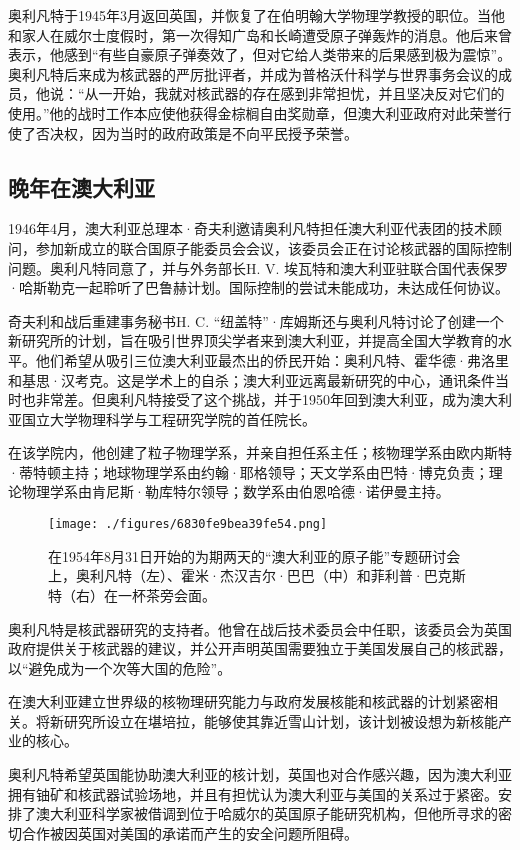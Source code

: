 奥利凡特于1945年3月返回英国，并恢复了在伯明翰大学物理学教授的职位。当他和家人在威尔士度假时，第一次得知广岛和长崎遭受原子弹轰炸的消息。他后来曾表示，他感到“有些自豪原子弹奏效了，但对它给人类带来的后果感到极为震惊”。奥利凡特后来成为核武器的严厉批评者，并成为普格沃什科学与世界事务会议的成员，他说：“从一开始，我就对核武器的存在感到非常担忧，并且坚决反对它们的使用。”他的战时工作本应使他获得金棕榈自由奖勋章，但澳大利亚政府对此荣誉行使了否决权，因为当时的政府政策是不向平民授予荣誉。
\subsection{晚年在澳大利亚}
1946年4月，澳大利亚总理本·奇夫利邀请奥利凡特担任澳大利亚代表团的技术顾问，参加新成立的联合国原子能委员会会议，该委员会正在讨论核武器的国际控制问题。奥利凡特同意了，并与外务部长H. V. 埃瓦特和澳大利亚驻联合国代表保罗·哈斯勒克一起聆听了巴鲁赫计划。国际控制的尝试未能成功，未达成任何协议。

奇夫利和战后重建事务秘书H. C. “纽盖特”·库姆斯还与奥利凡特讨论了创建一个新研究所的计划，旨在吸引世界顶尖学者来到澳大利亚，并提高全国大学教育的水平。他们希望从吸引三位澳大利亚最杰出的侨民开始：奥利凡特、霍华德·弗洛里和基思·汉考克。这是学术上的自杀；澳大利亚远离最新研究的中心，通讯条件当时也非常差。但奥利凡特接受了这个挑战，并于1950年回到澳大利亚，成为澳大利亚国立大学物理科学与工程研究学院的首任院长。

在该学院内，他创建了粒子物理学系，并亲自担任系主任；核物理学系由欧内斯特·蒂特顿主持；地球物理学系由约翰·耶格领导；天文学系由巴特·博克负责；理论物理学系由肯尼斯·勒库特尔领导；数学系由伯恩哈德·诺伊曼主持。
\begin{figure}[ht]
\centering
\texttt{[image: ./figures/6830fe9bea39fe54.png]}
\caption{在1954年8月31日开始的为期两天的“澳大利亚的原子能”专题研讨会上，奥利凡特（左）、霍米·杰汉吉尔·巴巴（中）和菲利普·巴克斯特（右）在一杯茶旁会面。} \label{fig_MKalft_8}
\end{figure}
奥利凡特是核武器研究的支持者。他曾在战后技术委员会中任职，该委员会为英国政府提供关于核武器的建议，并公开声明英国需要独立于美国发展自己的核武器，以“避免成为一个次等大国的危险”。

在澳大利亚建立世界级的核物理研究能力与政府发展核能和核武器的计划紧密相关。将新研究所设立在堪培拉，能够使其靠近雪山计划，该计划被设想为新核能产业的核心。

奥利凡特希望英国能协助澳大利亚的核计划，英国也对合作感兴趣，因为澳大利亚拥有铀矿和核武器试验场地，并且有担忧认为澳大利亚与美国的关系过于紧密。安排了澳大利亚科学家被借调到位于哈威尔的英国原子能研究机构，但他所寻求的密切合作被因英国对美国的承诺而产生的安全问题所阻碍。

